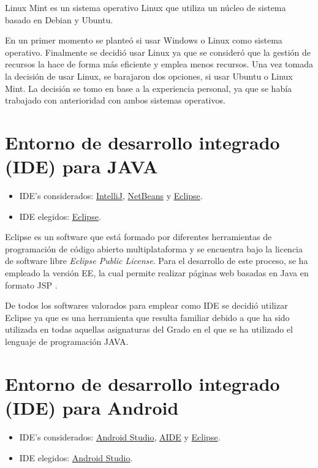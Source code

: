 Linux Mint es un sistema operativo Linux que utiliza un núcleo de sistema basado en Debian y Ubuntu.

En un primer momento se planteó si usar Windows o Linux como sistema operativo. Finalmente se decidió usar Linux ya que se consideró que la gestión de recursos la hace de forma más eficiente y emplea menos recursos. Una vez tomada la decisión de usar Linux, se barajaron dos opciones, si usar Ubuntu o Linux Mint. La decisión se tomo en base a la experiencia personal, ya que se había trabajado con anterioridad con ambos sistemas operativos.

\section{Entorno de desarrollo integrado (IDE) para JAVA}

\begin{itemize}
	\tightlist
	\item
	IDE's considerados: \href{https://www.jetbrains.com/idea/}{IntelliJ}, \href{https://netbeans.org/}{NetBeans} y \href{https://eclipse.org/}{Eclipse}.
	\item
	IDE elegidos: \href{https://eclipse.org/}{Eclipse}.
\end{itemize}

Eclipse es un software que está formado por diferentes herramientas de programación de código abierto multiplataforma y se encuentra bajo la licencia de software libre \textit{Eclipse Public License}. Para el desarrollo de este proceso, se ha empleado la versión EE, la cual permite realizar páginas web basadas en Java en formato JSP \cite{eclipse:info}.

De todos los softwares valorados para emplear como IDE se decidió utilizar Eclipse ya que es una herramienta que resulta familiar debido a que ha sido utilizada en todas aquellas asignaturas del Grado en el que se ha utilizado el lenguaje de programación JAVA.


\section{Entorno de desarrollo integrado (IDE) para Android}

\begin{itemize}
	\tightlist
	\item
	IDE's considerados: \href{https://developer.android.com/studio/}{Android Studio}, \href{http://www.android-ide.com/}{AIDE} y \href{https://eclipse.org/}{Eclipse}.
	\item
	IDE elegidos: \href{https://developer.android.com/studio/}{Android Studio}.
\end{itemize}

